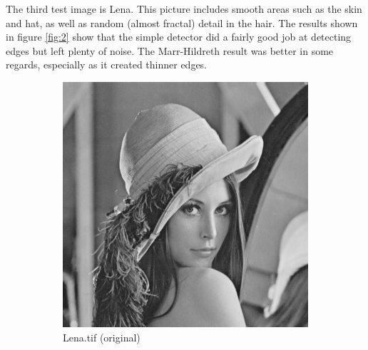 \documentclass[a4paper]{article}
\begin{document}
The third test image is Lena. This picture includes smooth areas such as the skin and hat, as well as random (almost fractal) detail in the hair. The results shown in figure \ref{fig:2} show that the simple detector did a fairly good job at detecting edges but left plenty of noise. The Marr-Hildreth result was better in some regards, especially as it created thinner edges.
\begin{figure}
    
        \centering
        \begin{subfigure}[b]{0.3\textwidth}
                \centering
                \includegraphics[width=\textwidth]{q1-lena-orig.png}
                \caption{Lena.tif (original)}
                \label{fig:2a}
        \end{subfigure}
        \begin{subfigure}[b]{0.3\textwidth}
                \centering

\end{subfigure}
\end{figure}
\end{document}
